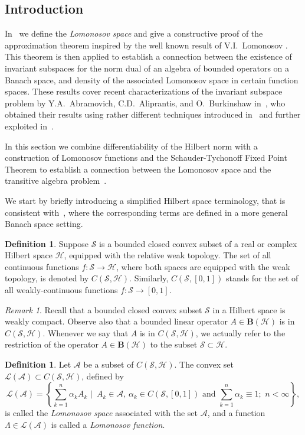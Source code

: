 \documentclass{tran-l}
\theoremstyle{definition}
\newtheorem{defn}[thm]{Definition}
\theoremstyle{remark}
\newtheorem{rem}[thm]{Remark}
\numberwithin{equation}{subsection}
\newcommand{\To}{\longrightarrow}
\newcommand{\h}{\mathcal{H}}
\newcommand{\s}{\mathcal{S}}
\newcommand{\A}{\mathcal{A}}
\newcommand{\BH}{\mathbf{B}(\mathcal{H})}
\newcommand{\Lom}{\mathcal{L}}
\newcommand{\set}[1]{\left\{#1\right\}}
\begin{document}
\subsection{Introduction}
In~\cite{Sim96a} we define the \emph{Lomonosov space} and give a constructive proof of the approximation theorem inspired by the well known result of V.I.~Lo\-mo\-no\-sov \cite{Lom73}. This theorem is then applied to establish a connection between the existence of invariant subspaces for the norm dual of an algebra of bounded operators on a Banach space, and density of the associated Lomonosov space in certain function spaces. These results cover recent characterizations of the invariant subspace problem by Y.A.~Abramovich, C.D.~Aliprantis, and O.~Burkinshaw in~\cite{AAB95}, who obtained their results using rather different techniques introduced in~\cite{Lom91} and further exploited in~\cite{dB93}.

In this section we combine differentiability of the Hilbert norm with a construction of Lomonosov functions and the Schauder-Tychonoff Fixed Point Theorem to establish a connection between the Lomonosov space and the transitive algebra problem~\cite{RR73}.

We start by briefly introducing a simplified Hilbert space terminology, that is consistent with~\cite{Sim96a}, where the corresponding terms are defined in a more general Banach space setting.

\begin{defn}
Suppose $\s$ is a bounded closed convex subset of a real or complex Hilbert space $\h$, equipped with the relative weak topology. The set of all continuous functions $f\colon\s\To\h$, where both spaces are equipped with the weak topology, is denoted by $C(\s,\h)$. Similarly, $C(\s,[0,1])$ stands for the set of all weakly-continuous functions $f\colon\s\To[0,1]$.
\end{defn}

\begin{rem}
Recall that a bounded closed convex subset $\s$ in a Hilbert space is weakly compact. Observe also that a bounded linear operator $A\in\BH$ is in $C(\s,\h)$. Whenever we say that $A$ is in $C(\s,\h)$, we actually refer to the restriction of the operator $A\in\BH$ to the subset $\s\subset\h$.
\end{rem}

\begin{defn}
Let $\A$ be a subset of $C(\s,\h)$. The convex set $\Lom(\A) \subset C(\s,\h)$, defined by
\[ \Lom(\A) = \set{ \sum_{k=1}^n \alpha_k A_k\,\,|\,\,\, A_k\in\A,\,
 \alpha_k\in C(\s,[0,1]) \text{ and } \sum_{k=1}^n\alpha_k \equiv 1;
 \,\, n < \infty}, \]
is called the \emph{Lomonosov space} associated with the set $\A$, and a function $\Lambda\in\Lom(\A)$ is called a \emph{Lomonosov function}.
\end{defn}
\end{document}

